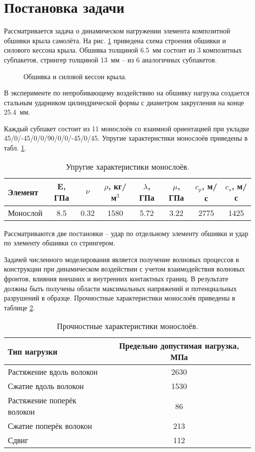 \section{Постановка задачи}

Рассматривается задача о динамическом нагружении элемента композитной обшивки крыла самолёта. На рис.
\ref{pic:construction_intro} приведена схема строения обшивки и силового кессона крыла. Обшивка толщиной 6.5~мм состоит из 3 композитных субпакетов, стрингер толщиной 13~мм -- из 6 аналогичных субпакетов.

\begin{figure}[h]
\caption{Обшивка и силовой кессон крыла.}
\label{pic:construction_intro}
\end{figure}

В эксперименте по непробивающему воздействию на обшивку нагрузка создается стальным 
ударником цилиндрической формы с диаметром закругления на конце 25.4~мм.

Каждый субпакет состоит из 11 монослоёв со взаимной ориентацией при укладке 
45/0/-45/0/0/90/0/0/-45/0/45. Упругие характеристики монослоёв приведены в табл. \ref{tbl:subpackage_intro}.

\begin{table}[h]
\centering
\begin{tabular}{|p{3cm}|c|c|c|c|c|c|c|}
\hline
Элемент & E, ГПа & $\nu$ & $\rho$, кг/м$^{3}$ & $\lambda$, ГПа & $\mu$, ГПа &
$c_p$, м/с & $c_s$, м/с \\
\hline
Монослой & 8.5 & 0.32 & 1580 & 5.72 & 3.22 & 2775 & 1425 \\
\hline
\end{tabular}
\caption{Упругие характеристики монослоёв.}
\label{tbl:subpackage_intro}
\end{table}

Рассматриваются две постановки -- удар по отдельному элементу обшивки и удар по элементу обшивки со стрингером.

Задачей численного моделирования является получение волновых процессов в конструкции при динамическом воздействии с учетом взаимодействия волновых фронтов, влияния внешних и внутренних контактных границ. В результате должны быть получены области максимальных напряжений и потенциальных разрушений в образце. Прочностные характеристики монослоёв приведены в таблице \ref{tbl:max_stresses_intro}.

\begin{table}[h]
\centering
\begin{tabular}{|l|c|}
\hline
Тип нагрузки & Предельно допустимая нагрузка, МПа \\
\hline
Растяжение вдоль волокон & 2630 \\
Сжатие вдоль волокон & 1530 \\
Растяжение поперёк волокон & 86 \\
Сжатие поперёк волокон & 213 \\
Сдвиг & 112 \\
\hline
\end{tabular}
\caption{Прочностные характеристики монослоёв.}
\label{tbl:max_stresses_intro}
\end{table}

